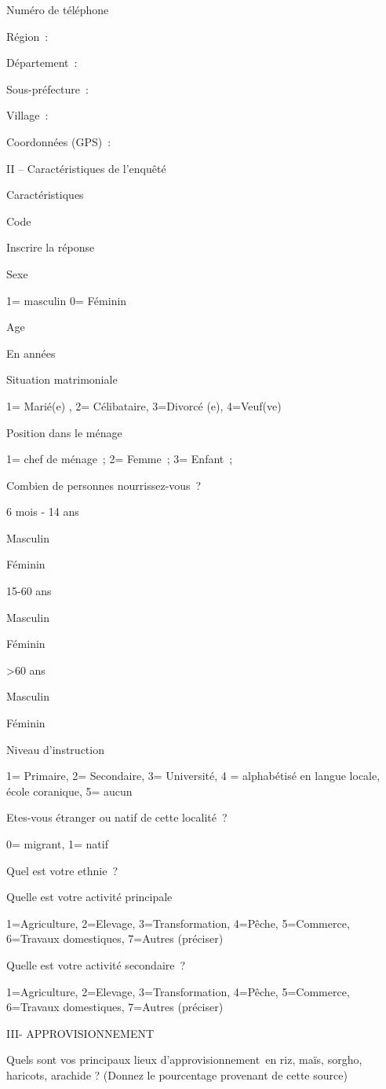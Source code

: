 \documentclass[12pt,oneside]{report}
\begin{document}
Numéro de téléphone

Région :

Département :

Sous-préfecture :

Village :

Coordonnées (GPS) :

II – Caractéristiques de l’enquêté

Caractéristiques

Code

Inscrire la réponse

Sexe

1= masculin           0= Féminin

Age

En années

Situation matrimoniale

1= Marié(e) , 2=  Célibataire, 3=Divorcé (e), 4=Veuf(ve)

Position dans le ménage

1= chef de ménage ; 2= Femme ; 3= Enfant ;

Combien de personnes nourrissez-vous ?

6 mois - 14 ans

Masculin

Féminin

15-60 ans

Masculin

Féminin

>60 ans

Masculin

Féminin

Niveau d’instruction

1= Primaire, 2= Secondaire, 3= Université, 4 = alphabétisé en langue locale, école coranique, 5=  aucun

Etes-vous étranger ou natif de cette localité ?

0= migrant, 1= natif

Quel est votre ethnie ?

Quelle est votre activité principale

1=Agriculture, 2=Elevage, 3=Transformation, 4=Pêche, 5=Commerce, 6=Travaux domestiques, 7=Autres (préciser)

Quelle est votre activité secondaire ?

1=Agriculture, 2=Elevage, 3=Transformation, 4=Pêche, 5=Commerce, 6=Travaux domestiques, 7=Autres (préciser)

III- APPROVISIONNEMENT

Quels sont vos principaux lieux d’approvisionnement en riz, maïs, sorgho, haricots, arachide ? (Donnez le pourcentage provenant de cette source)
\end{document}
